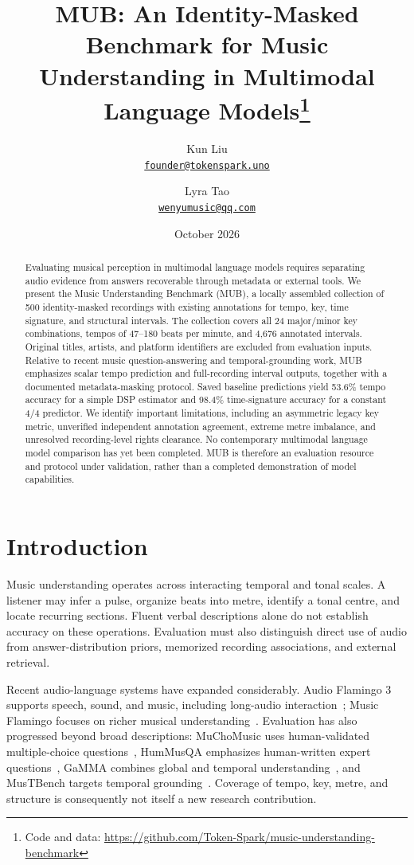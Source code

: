 \documentclass[11pt,a4paper]{article}
\title{\textbf{MUB: An Identity-Masked Benchmark for Music Understanding in Multimodal Language Models}\thanks{Code and data: \url{https://github.com/Token-Spark/music-understanding-benchmark}}}
\author{Kun Liu\\\href{mailto:founder@tokenspark.uno}{\texttt{founder@tokenspark.uno}}
\and Lyra Tao\\\href{mailto:wenyumusic@qq.com}{\texttt{wenyumusic@qq.com}}}
\date{October 2026}
\begin{document}
\maketitle

\begin{abstract}
Evaluating musical perception in multimodal language models requires separating audio evidence from answers recoverable through metadata or external tools. We present the Music Understanding Benchmark (MUB), a locally assembled collection of 500 identity-masked recordings with existing annotations for tempo, key, time signature, and structural intervals. The collection covers all 24 major/minor key combinations, tempos of 47--180 beats per minute, and 4,676 annotated intervals. Original titles, artists, and platform identifiers are excluded from evaluation inputs. Relative to recent music question-answering and temporal-grounding work, MUB emphasizes scalar tempo prediction and full-recording interval outputs, together with a documented metadata-masking protocol. Saved baseline predictions yield 53.6\% tempo accuracy for a simple DSP estimator and 98.4\% time-signature accuracy for a constant 4/4 predictor. We identify important limitations, including an asymmetric legacy key metric, unverified independent annotation agreement, extreme metre imbalance, and unresolved recording-level rights clearance. No contemporary multimodal language model comparison has yet been completed. MUB is therefore an evaluation resource and protocol under validation, rather than a completed demonstration of model capabilities.
\end{abstract}

\section{Introduction}
\label{sec:intro}
Music understanding operates across interacting temporal and tonal scales. A listener may infer a pulse, organize beats into metre, identify a tonal centre, and locate recurring sections. Fluent verbal descriptions alone do not establish accuracy on these operations. Evaluation must also distinguish direct use of audio from answer-distribution priors, memorized recording associations, and external retrieval.

Recent audio-language systems have expanded considerably. Audio Flamingo 3 supports speech, sound, and music, including long-audio interaction~\cite{af3}; Music Flamingo focuses on richer musical understanding~\cite{music-flamingo}. Evaluation has also progressed beyond broad descriptions: MuChoMusic uses human-validated multiple-choice questions~\cite{muchomusic}, HumMusQA emphasizes human-written expert questions~\cite{hummusqa}, GaMMA combines global and temporal understanding~\cite{gamma}, and MusTBench targets temporal grounding~\cite{mustbench}. Coverage of tempo, key, metre, and structure is consequently not itself a new research contribution.
\end{document}
